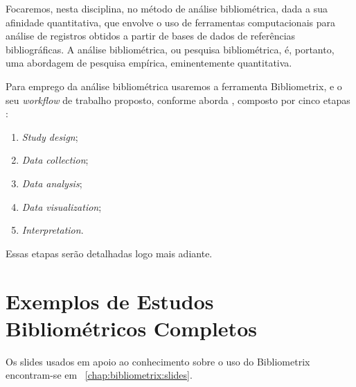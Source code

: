 Focaremos, nesta disciplina, no método de análise bibliométrica, dada a sua afinidade quantitativa, que envolve o uso de ferramentas computacionais para análise de registros obtidos a partir de bases de dados de referências bibliográficas. A análise bibliométrica, ou pesquisa bibliométrica, é, portanto, uma abordagem de pesquisa empírica, eminentemente quantitativa.

Para emprego da análise bibliométrica usaremos a ferramenta Bibliometrix, e o seu \textit{workflow} de trabalho proposto, conforme aborda \cite{aria_bibliometrix_2017}, composto por cinco etapas \cite[p. 950]{aria_bibliometrix_2017}:
\begin{enumerate}
\item \textit{Study design};
\item \textit{Data collection};
\item \textit{Data analysis};
\item \textit{Data visualization};
\item \textit{Interpretation}.
\end{enumerate}

Essas etapas serão detalhadas logo mais adiante.

\section{Exemplos de Estudos Bibliométricos Completos}

Os slides usados em apoio ao conhecimento sobre o uso do Bibliometrix encontram-se em ~\ref{chap:bibliometrix:slides}.

